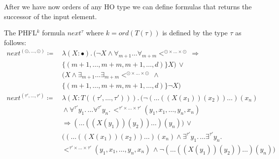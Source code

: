 After we have now orders of any HO type we can define formulas that returns the successor of the input element.

\begin{definition}
    The PHFL$^k$ formula $next^\tau$ where $k = ord(T(\tau))$ is defined by the type $\tau$ as follows:
    \begin{align*}
        next^{(\odot, \dots, \odot)} \coloneqq &\,\lambda (X \colon \bullet).\, (\neg X \wedge \forall_{m +
        1}\dots\forall_{m + m}<^{\odot \times \dots \times \odot}\, \Rightarrow \\&\,\{(m +
        1, \dots, m + m, m + 1, \dots, d)\} X) \,\vee \\&\,(X \wedge \exists_{m + 1}\dots\exists_{m + m} <^{\odot
        \times \dots \times \odot} \,\wedge \\&\,\{(m + 1, \dots, m + m, m + 1, \dots, d)\}
        \neg X)\\
        next^{(\tau', \dots, \tau')} \coloneqq &\,\lambda (X \colon T ((\tau', \dots, \tau'))).\,(\neg (\dots((X
        (x_1))(x_2))\dots) (x_n) \\&\, \wedge \forall^{\tau'}y_1.\, \dots \forall^{\tau'}y_n.\,<^{\tau' \times
        \dots \times \tau'}(y_1, x_1, \dots, y_n, x_n) \\&\,\Rightarrow  (\dots((X(y_1))(y_2))\dots)(y_n)) \,\vee
        \\&\,((\dots ((X(x_1))(x_2)) \dots)(x_n) \wedge \exists^{\tau'}y_1.\, \dots \exists^{\tau'}y_n.\, \\&\,
        <^{\tau' \times \dots \times \tau'}
        (y_1, x_1,
        \dots, y_n, x_n)\,\wedge \neg (\dots((X(y_1))(y_2))\dots)(y_n))
    \end{align*}
\end{definition}

